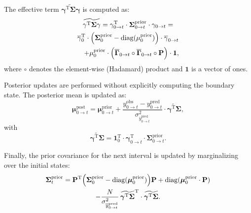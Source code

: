 \documentclass[pdflatex,sn-nature]{sn-jnl}%
\theoremstyle{thmstyleone}%
\theoremstyle{thmstyletwo}%
\theoremstyle{thmstylethree}%
\begin{document}
The effective term \( \widetilde{\mathbf{\gamma}^{\mathrm{T}} \mathbf{\Sigma}\mathbf{\gamma}} \) is computed as:
\begin{multline}
	\widetilde{\mathbf{\gamma}^{\mathrm{T}} \mathbf{\Sigma}\mathbf{\gamma}} = \mathbf{\gamma}^{\mathrm{T}}_{0 \rightarrow t} \cdot \mathbf{\Sigma}^{\text{prior}}_{0 \rightarrow t} \cdot \mathbf{\gamma}_{0 \rightarrow t} = \\
	\overline{\mathbf{\gamma}}_{0}^{\mathrm{T}} \cdot \Bigl( \mathbf{\Sigma}^{\text{prior}}_{0} - \mathrm{diag}(\mathbf{\mu}^{\text{prior}}_0) \Bigr) \cdot \overline{\mathbf{\gamma}}_{0 \rightarrow t} \\
	\quad + \mathbf{\mu}^{\text{prior}}_0 \cdot \Bigl( \overline{\mathbf{\Gamma}}_{0 \rightarrow t} \circ \overline{\mathbf{\Gamma}}_{0 \rightarrow t} \circ \mathbf{P} \Bigr) \cdot \mathbf{1},
	\label{eq:simplified_boundary_state}
\end{multline}
where \( \circ \) denotes the element-wise (Hadamard) product and \( \mathbf{1} \) is a vector of ones.

Posterior updates are performed without explicitly computing the boundary state. The posterior mean is updated as:
\begin{equation}
	\mathbf{\mu}^{\text{post}}_{0 \rightarrow t} = \mathbf{\mu}^{\text{prior}}_{0 \rightarrow t} + \frac{y^{\text{obs}}_{0 \rightarrow t} - y^{\text{pred}}_{0 \rightarrow t}}{\sigma^2_{\overline{y}^{\text{pred}}_{0 \rightarrow t}}} \cdot \widetilde{\boldsymbol{\gamma}^{\mathrm{T}} \boldsymbol{\Sigma}},
	\label{eq:macro_interval_posterior_mean}
\end{equation}
with
\begin{equation}
	\widetilde{\boldsymbol{\gamma}^{\mathrm{T}} \boldsymbol{\Sigma}} = \mathbf{1}_0^{\mathrm{T}} \cdot \mathbf{\gamma}^{\mathrm{T}}_{0 \rightarrow t} \cdot \mathbf{\Sigma}^{\text{prior}}_{0 \rightarrow t}.
	\label{eq:interval_gamma_sigma}
\end{equation}

Finally, the prior covariance for the next interval is updated by marginalizing over the initial states:
\begin{multline}
	\boldsymbol{\Sigma}^{\text{prior}}_{t} = \mathbf{P}^{\mathrm{T}} \Bigl( \boldsymbol{\Sigma}^{\text{prior}}_{0} - \mathrm{diag}(\boldsymbol{\mu}^{\text{prior}}_{0}) \Bigr) \mathbf{P} + \mathrm{diag}(\boldsymbol{\mu}^{\text{prior}}_{0} \cdot \mathbf{P}) \\
	- \frac{N}{\sigma^2_{\overline{y}^{\text{pred}}_{0 \rightarrow t}}} \, \widetilde{\boldsymbol{\gamma}^{\mathrm{T}} \boldsymbol{\Sigma}}^{\mathrm{T}} \cdot \widetilde{\boldsymbol{\gamma}^{\mathrm{T}} \boldsymbol{\Sigma}}.
	\label{eq:prior_covariance_update_0_t}
\end{multline}
\end{document}

